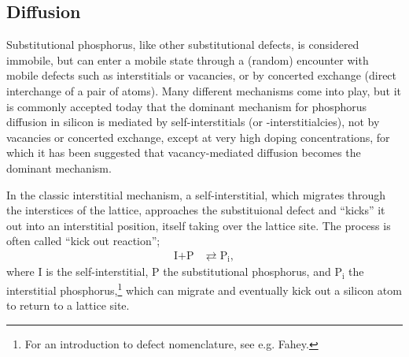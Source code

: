 \documentclass[11pt,bibliography=totoc,index=totoc]{scrbook}   %
\begin{document}






%
\subsection{Diffusion}\label{sec:PDiffusion}
%

Substitutional phosphorus, like other substitutional defects, is considered immobile, but can enter a mobile state through a (random) encounter with mobile defects such as interstitials or vacancies, or by concerted exchange (direct interchange of a pair of atoms).
Many different mechanisms come into play, but it is commonly accepted today that the dominant mechanism for phosphorus diffusion in silicon is mediated by self-interstitials (or -interstitialcies), not by vacancies or concerted exchange, except at very high doping concentrations, for which it has been suggested that vacancy-mediated diffusion becomes the dominant mechanism.\cite{Ural:1999,Bentzen:2006}

In the classic interstitial mechanism, a self-interstitial, which migrates through the interstices of the lattice, approaches the substituional defect and ``kicks'' it out into an interstitial position, itself taking over the lattice site. The process is often called ``kick out reaction'';\cite{Fahey:1989}
\begin{align*}
    \text{I} + \text{P} &\rightleftarrows \text{P}_{\text{i}},
\end{align*}
where I is the self-interstitial, P the substitutional phosphorus, and P$_{\text{i}}$ the interstitial phosphorus,\footnote{For an introduction to defect nomenclature, see e.g. Fahey\cite{Fahey:1989}.} which can migrate and eventually kick out a silicon atom to return to a lattice site.
\end{document}
